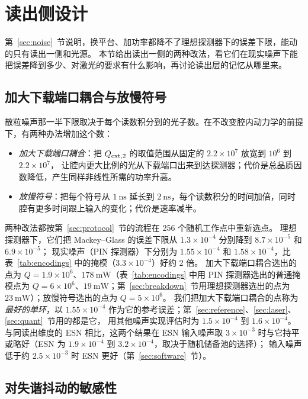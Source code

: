 \section{读出侧设计}\label{sec:readout}

第~\ref{sec:noise}~节说明，换平台、加功率都降不了理想探测器下的误差下限，能动的只有读出一侧和光源。
本节给出读出一侧的两种改法，看它们在现实噪声下能把误差降到多少、对激光的要求有什么影响，再讨论读出层的记忆从哪里来。

\subsection{加大下载端口耦合与放慢符号}

散粒噪声那一半下限取决于每个读数积分到的光子数。在不改变腔内动力学的前提下，有两种办法增加这个数：
\begin{itemize}
\item \emph{加大下载端口耦合}：把 $Q_{\mathrm{ext},2}$ 的取值范围从固定的 $2.2\times10^{7}$ 放宽到 $10^{6}$ 到 $2.2\times10^{7}$，
      让腔内更大比例的光从下载端口出来到达探测器；代价是总品质因数降低，产生同样非线性所需的功率升高。
\item \emph{放慢符号}：把每个符号从 $1~\mathrm{ns}$ 延长到 $2~\mathrm{ns}$，每个读数积分的时间加倍，同时腔有更多时间跟上输入的变化；代价是速率减半。
\end{itemize}
两种改法都按第~\ref{sec:protocol}~节的流程在 256 个随机工作点中重新选点。
理想探测器下，它们把 Mackey--Glass 的误差下限从 $1.3\times10^{-4}$ 分别降到 $8.7\times10^{-5}$ 和 $6.9\times10^{-5}$；
现实噪声（PIN 探测器）下分别为 $1.55\times10^{-4}$ 和 $1.58\times10^{-4}$，比表~\ref{tab:encodings} 中的掩模（$3.3\times10^{-4}$）好约 2 倍。
加大下载端口耦合选出的点为 $Q=1.9\times10^{6}$、$178~\mathrm{mW}$（表~\ref{tab:encodings} 中用 PIN 探测器选出的普通掩模点为 $Q=6\times10^{6}$、$19~\mathrm{mW}$；第~\ref{sec:breakdown}~节用理想探测器选出的点为 $23~\mathrm{mW}$）；放慢符号选出的点为 $Q=5\times10^{6}$。
我们把加大下载端口耦合的点称为\emph{最好的单环}，以 $1.55\times10^{-4}$ 作为它的参考误差；第~\ref{sec:reference}、\ref{sec:laser}、\ref{sec:quant}~节用的都是它，
用其他噪声实现评估时为 $1.5\times10^{-4}$ 到 $1.6\times10^{-4}$。
与同读出维度的 ESN 相比，这两个结果在 ESN 输入噪声取 $3\times10^{-3}$ 时与它持平或略好（ESN 为 $1.9\times10^{-4}$ 到 $3.2\times10^{-4}$，取决于随机储备池的选择）；
输入噪声低于约 $2.5\times10^{-3}$ 时 ESN 更好（第~\ref{sec:software}~节）。

\subsection{对失谐抖动的敏感性}

